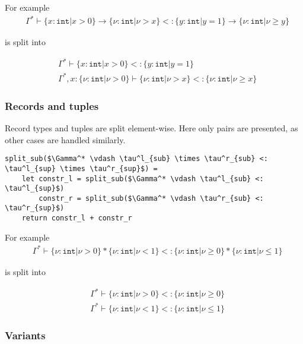 For example
\begin{align*}
  & \Gamma^* \vdash \{x : \texttt{int} | x > 0\} \to \{\nu : \texttt{int} | \nu >
    x\} <: \{y : \texttt{int} | y = 1\} \to \{\nu : \texttt{int} | \nu \geq y\}
\end{align*}

is split into

\begin{align*}
  & \Gamma^* \vdash \{x : \texttt{int} | x > 0\} <: \{y : \texttt{int} | y = 1\}\\
  & \Gamma^*, x : \{\nu : \texttt{int} | \nu > 0\} \vdash \{\nu : \texttt{int} | \nu >
    x\} <: \{\nu : \texttt{int} | \nu \geq x\}
\end{align*}

\subsubsection{Records and tuples}

Record types and tuples are split element-wise. Here only pairs are presented,
as other cases are handled similarly.

\begin{lstlisting}[language=pseudocode]
split_sub($\Gamma^* \vdash \tau^l_{sub} \times \tau^r_{sub} <: \tau^l_{sup} \times \tau^r_{sup}$) =
    let constr_l = split_sub($\Gamma^* \vdash \tau^l_{sub} <: \tau^l_{sup}$)
        constr_r = split_sub($\Gamma^* \vdash \tau^r_{sub} <: \tau^r_{sup}$)
    return constr_l + constr_r
\end{lstlisting}

For example
\begin{align*}
  & \Gamma^* \vdash \{\nu : \texttt{int} | \nu > 0\} * \{\nu : \texttt{int} | \nu < 1\} <: \{\nu : \texttt{int} | \nu \geq 0\} * \{\nu : \texttt{int} | \nu \leq 1\}
\end{align*}

is split into

\begin{align*}
  & \Gamma^* \vdash \{\nu : \texttt{int} | \nu > 0\} <: \{\nu : \texttt{int} | \nu \geq 0\}\\
  & \Gamma^* \vdash \{\nu : \texttt{int} | \nu < 1\} <: \{\nu : \texttt{int} | \nu \leq 1\}
\end{align*}

\subsubsection{Variants}

